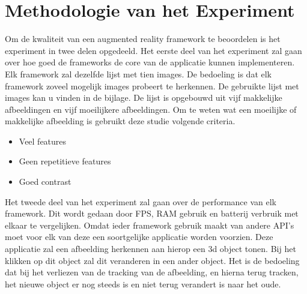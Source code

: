 
\chapter{Methodologie van het Experiment}
\label{ch:methodologie}

Om de kwaliteit van een augmented reality framework te beoordelen is het experiment in twee delen opgedeeld. Het eerste deel van het experiment zal gaan over hoe goed de frameworks de core van de applicatie kunnen implementeren. Elk framework zal dezelfde lijst met tien images. De bedoeling is dat elk framework zoveel mogelijk images probeert te herkennen. De gebruikte lijst met images kan u vinden in de bijlage. De lijst is opgebouwd uit vijf makkelijke afbeeldingen en vijf moeilijkere afbeeldingen. Om te weten wat een moeilijke of makkelijke afbeelding is gebruikt deze studie volgende criteria.

\begin{itemize}
    \item Veel features
    \item Geen repetitieve features
    \item Goed contrast
\end{itemize} 


Het tweede deel van het experiment zal gaan over de performance van elk framework. Dit wordt gedaan door FPS, RAM gebruik en batterij verbruik met elkaar te vergelijken. Omdat ieder framework gebruik maakt van andere API's moet voor elk van deze een soortgelijke applicatie worden voorzien. Deze applicatie zal een afbeelding herkennen aan hierop een 3d object tonen. Bij het klikken op dit object zal dit veranderen in een ander object. Het is de bedoeling dat bij het verliezen van de tracking van de afbeelding, en hierna terug tracken, het nieuwe object er nog steeds is en niet terug verandert is naar het oude.
